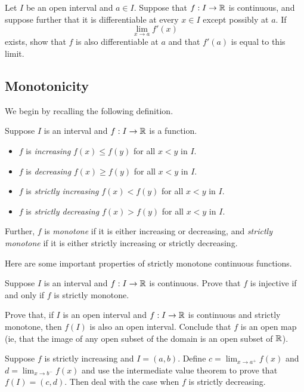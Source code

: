 \begin{exercise} \label{continuous-and-differentiable-except-at-point}
	Let $I$ be an open interval and $a \in I$. Suppose that $f : I \to \mathbb{R}$ is continuous, and suppose further that it is differentiable at every $x \in I$ except possibly at $a$. If \[ \lim_{x \to a} f'(x) \]
	exists, show that $f$ is also differentiable at $a$ and that $f'(a)$ is equal to this limit. 
\end{exercise}

\subsection{Monotonicity}

We begin by recalling the following definition. 

\begin{definition}       
	Suppose $I$ is an interval and $f : I \to \mathbb{R}$ is a function.
	\begin{itemize}
		\item $f$ is \emph{increasing} $f(x) \leq f(y)$ for all $x < y$ in $I$. 
		\item $f$ is \emph{decreasing} $f(x) \geq f(y)$ for all $x < y$ in $I$.
		\item $f$ is \emph{strictly increasing} $f(x) < f(y)$ for all $x < y$ in $I$. 
		\item $f$ is \emph{strictly decreasing} $f(x) > f(y)$ for all $x < y$ in $I$. 
	\end{itemize}
Further, $f$ is \emph{monotone} if it is either increasing or decreasing, and \emph{strictly monotone} if it is either strictly increasing or strictly decreasing. 
\end{definition}

Here are some important properties of strictly monotone continuous functions.

\begin{exercise} \label{strictly-monotone-iff-injective}
	Suppose $I$ is an interval and $f : I \to \mathbb{R}$ is continuous. Prove that $f$ is injective if and only if $f$ is strictly monotone. 
\end{exercise}

\begin{exercise} \label{strictly-monotone-implies-open}
	Prove that, if $I$ is an open interval and $f : I \to \mathbb{R}$ is continuous and strictly monotone, then $f(I)$ is also an open interval. Conclude that $f$ is an open map (ie, that the image of any open subset of the domain is an open subset of $\mathbb{R}$).
	\begin{hint}
		Suppose $f$ is strictly increasing and $I = (a, b)$. Define $c = \lim_{x \to a^+} f(x)$ and $d = \lim_{x \to b^-} f(x)$ and use the intermediate value theorem to prove that $f(I) = (c, d)$. Then deal with the case when $f$ is strictly decreasing. 
	\end{hint}
\end{exercise}

